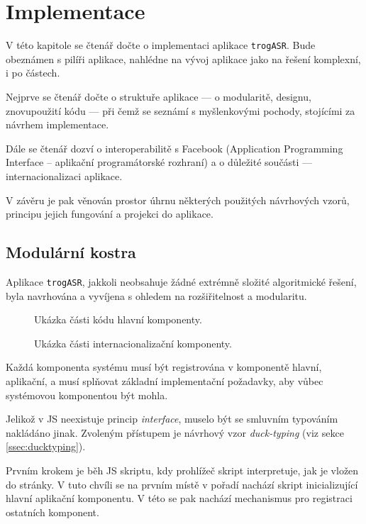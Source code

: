 \chapter{Implementace}
\label{chap:solution}

V této kapitole se čtenář dočte o implementaci aplikace \verb|trogASR|. Bude obeznámen s pilíři aplikace, nahlédne na vývoj aplikace jako na řešení komplexní, i po částech.

Nejprve se čtenář dočte o struktuře aplikace --- o modularitě, designu, znovupoužití kódu --- při čemž se seznámí s myšlenkovými pochody, stojícími za návrhem implementace.

Dále se čtenář dozví o interoperabilitě s Facebook  (Application Programming Interface -- aplikační programátorské rozhraní) a o důležité součásti --- internacionalizaci aplikace.

V závěru je pak věnován prostor úhrnu některých použitých návrhových vzorů, principu jejich fungování a projekci do aplikace.

\section{Modulární kostra}

Aplikace \verb|trogASR|, jakkoli neobsahuje žádné extrémně složité algoritmické řešení, byla navrhována a vyvíjena s ohledem na rozšiřitelnost a modularitu. 
\\
\begin{figure}[h]
	
	\caption{Ukázka části kódu hlavní komponenty.}
	\label{fig:app}
\end{figure}

\begin{figure}[h]
	
	\caption{Ukázka části internacionalizační komponenty.}
	\label{fig:comp}
\end{figure}

Každá komponenta systému musí být registrována v komponentě hlavní, aplikační, a musí splňovat základní implementační požadavky, aby vůbec systémovou komponentou být mohla.

Jelikož v JS neexistuje princip {\sl interface}, muselo být se smluvním typováním nakládáno jinak. Zvoleným přístupem je návrhový vzor {\sl duck-typing} (viz sekce \ref{ssec:ducktyping}).

Prvním krokem je běh JS skriptu, kdy prohlížeč skript interpretuje, jak je vložen do stránky. V tuto chvíli se na prvním místě v pořadí nachází skript inicializující hlavní aplikační komponentu. V této se pak nachází mechanismus pro registraci ostatních komponent.

